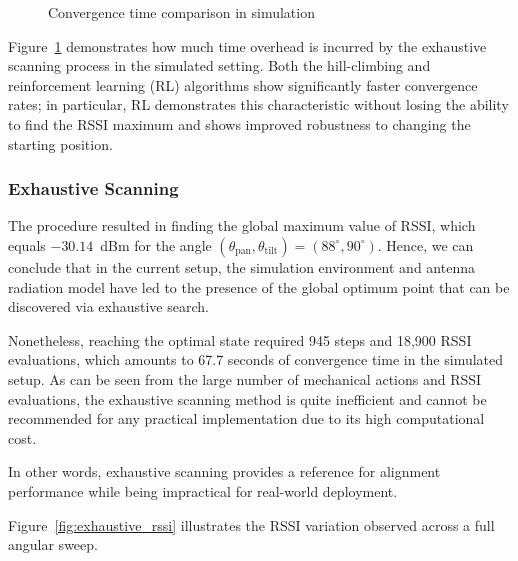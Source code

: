 \begin{figure}[H]
\centering
{}
\vspace{0.2cm}
\caption{Convergence time comparison in simulation}
\label{fig:sim_convergence_chart}
\end{figure}

Figure~\ref{fig:sim_convergence_chart} demonstrates how much time overhead is incurred by the exhaustive scanning process in the simulated setting. Both the hill-climbing and reinforcement learning (RL) algorithms show significantly faster convergence rates; in particular, RL demonstrates this characteristic without losing the ability to find the RSSI maximum and shows improved robustness to changing the starting position.

\subsubsection{Exhaustive Scanning}
The procedure resulted in finding the global maximum value of RSSI, which equals $-30.14$~dBm for the angle $(\theta_{\text{pan}}, \theta_{\text{tilt}}) =
(88^{\circ}, 90^{\circ})$. Hence, we can conclude that in the current setup, the simulation environment and antenna radiation model have led to the presence of the global optimum point that can be discovered via exhaustive search.

Nonetheless, reaching the optimal state required 945 steps and 18,900 RSSI evaluations, which amounts to 67.7 seconds of convergence time in the simulated setup. As can be seen from the large number of mechanical actions and RSSI evaluations, the exhaustive scanning method is quite inefficient and cannot be recommended for any practical implementation due to its high computational cost.

In other words, exhaustive scanning provides a reference for alignment performance while being impractical for real-world deployment.

Figure~\ref{fig:exhaustive_rssi} illustrates the RSSI variation observed across a full
angular sweep.

